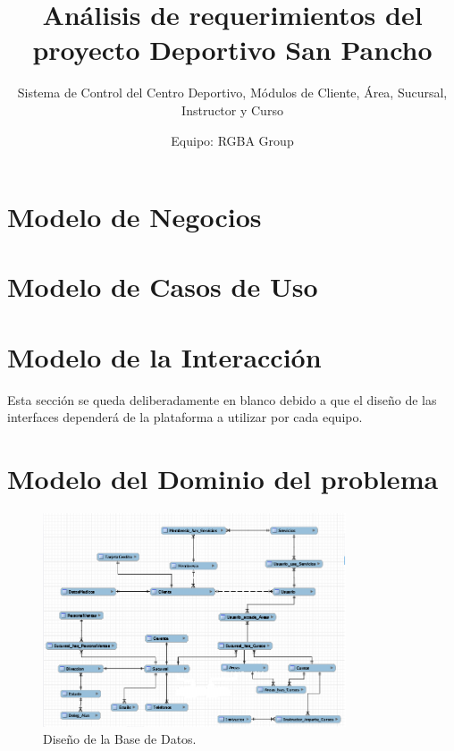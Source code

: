 \documentclass[oneside,10pt]{book}
\title{Análisis de requerimientos del proyecto Deportivo San Pancho}
\subtitle{Sistema de Control del Centro Deportivo, Módulos de Cliente, Área, Sucursal, Instructor y Curso}
\author{Equipo: RGBA Group}
\begin{document}
\maketitle
\thispagestyle{empty}

\frontmatter
\tableofcontents

\mainmatter

\chapter{Modelo de Negocios}


\chapter{Modelo de Casos de Uso}
	

\chapter{Modelo de la Interacción}

{\color{UCInterfaceColor} 
	Esta sección se queda deliberadamente en blanco debido a que el diseño de las interfaces dependerá de la plataforma a utilizar por cada equipo.\\	
}



\chapter{Modelo del Dominio del problema}

	\begin{figure}[htbp!]
		\centering
			\includegraphics[width=0.8\textwidth]{images/baseGYMver2}
		\caption{Diseño de la Base de Datos.}
	\end{figure}
\end{document}

